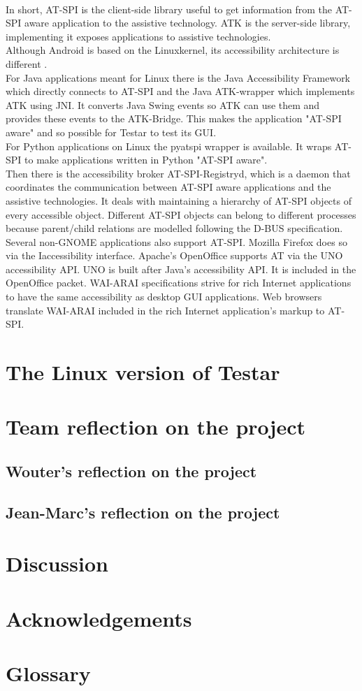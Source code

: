 \documentclass[11pt,twocolumn]{article}
\begin{document}
\\In short, AT-SPI is the client-side library useful to get information from the AT-SPI aware application to the assistive technology. ATK is the server-side library, implementing it exposes applications to assistive technologies. \cite{RN12}
\\Although Android is based on the Linuxkernel, its accessibility architecture is different \cite{RN11}.
\\For Java applications meant for Linux there is the Java Accessibility Framework which directly connects to AT-SPI and the Java ATK-wrapper which implements ATK using JNI. It converts Java Swing events so ATK can use them and provides these events to the ATK-Bridge. This makes the application "AT-SPI aware" and so possible for Testar to test its GUI.\cite{RN15}
\\For Python applications on Linux the pyatspi wrapper is available. It wraps AT-SPI to make applications written in Python "AT-SPI aware". 
\\Then there is the accessibility broker AT-SPI-Registryd, which is a daemon that coordinates the communication between AT-SPI aware applications and the assistive technologies. It deals with maintaining a hierarchy of AT-SPI objects of every accessible object\cite{RN27}. Different AT-SPI objects can belong to different processes because parent/child relations are modelled following the D-BUS specification.
Several non-GNOME applications also support AT-SPI. Mozilla Firefox does so via the Iaccessibility interface.\cite{RN16}
Apache’s OpenOffice supports AT via the UNO accessibility API. UNO is built after Java’s accessibility API. It is included in the OpenOffice packet.\cite{RN18}
WAI-ARAI specifications strive for rich Internet applications to have the same accessibility as desktop GUI applications. Web browsers translate WAI-ARAI included in the rich Internet application’s markup to AT-SPI.\cite{RN17}

\section{The Linux version of Testar}

\section{Team reflection on the project}
\subsection{Wouter's reflection on the project}
\subsection{Jean-Marc's reflection on the project}

\section{Discussion}

\section{Acknowledgements}
\section{Glossary}
\printglossaries
 
\printbibliography
\end{document}
